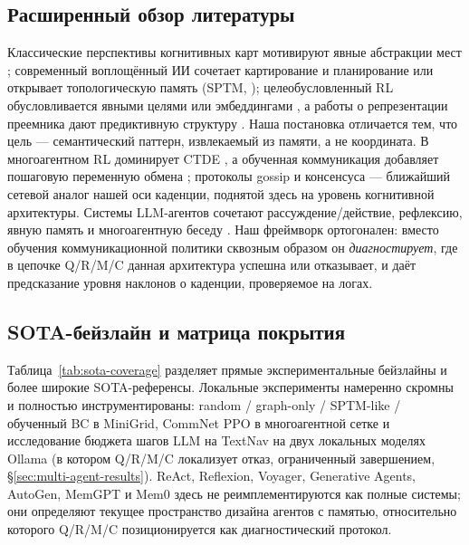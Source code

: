 \documentclass{article}
\begin{document}
\subsection{Расширенный обзор литературы}
\label{app:related-work-extended}

Классические перспективы когнитивных карт мотивируют явные абстракции мест \citep{tolman1948cognitive,okeefe1978hippocampus,kuipers2000spatial}; современный воплощённый ИИ сочетает картирование и планирование \citep{gupta2017cognitive} или открывает топологическую память (SPTM, \citealp{savinov2018semi}); целеобусловленный RL обусловливается явными целями или эмбеддингами \citep{andrychowicz2017hindsight,ghosh2021learning}, а работы о репрезентации преемника дают предиктивную структуру \citep{dayan1993improving,stachenfeld2017hippocampus,momennejad2017successor}. Наша постановка отличается тем, что цель --- семантический паттерн, извлекаемый из памяти, а не координата. В многоагентном RL доминирует CTDE \citep{lowe2017maddpg,foerster2018ctde}, а обученная коммуникация добавляет пошаговую переменную обмена \citep{sukhbaatar2016commnet,foerster2016learning}; протоколы gossip и консенсуса \citep{boyd2006gossip,xiao2007distributed} --- ближайший сетевой аналог нашей оси каденции, поднятой здесь на уровень когнитивной архитектуры. Системы LLM-агентов сочетают рассуждение/действие, рефлексию, явную память и многоагентную беседу \citep{yao2022react,shinn2023reflexion,wang2023voyager,park2023generative,wu2023autogen,packer2023memgpt,chhikara2025mem0}. Наш фреймворк ортогонален: вместо обучения коммуникационной политики сквозным образом он \emph{диагностирует}, где в цепочке Q/R/M/C данная архитектура успешна или отказывает, и даёт предсказание уровня наклонов о каденции, проверяемое на логах.

\subsection{SOTA-бейзлайн и матрица покрытия}
\label{app:sota-coverage}

Таблица~\ref{tab:sota-coverage} разделяет прямые экспериментальные бейзлайны и более широкие SOTA-референсы. Локальные эксперименты намеренно скромны и полностью инструментированы: random / graph-only / SPTM-like / обученный BC в MiniGrid, CommNet PPO в многоагентной сетке и исследование бюджета шагов LLM на TextNav на двух локальных моделях Ollama (в котором Q/R/M/C локализует отказ, ограниченный завершением, \S\ref{sec:multi-agent-results}). ReAct, Reflexion, Voyager, Generative Agents, AutoGen, MemGPT и Mem0 здесь не реимплементируются как полные системы; они определяют текущее пространство дизайна агентов с памятью, относительно которого Q/R/M/C позиционируется как диагностический протокол.
\end{document}
